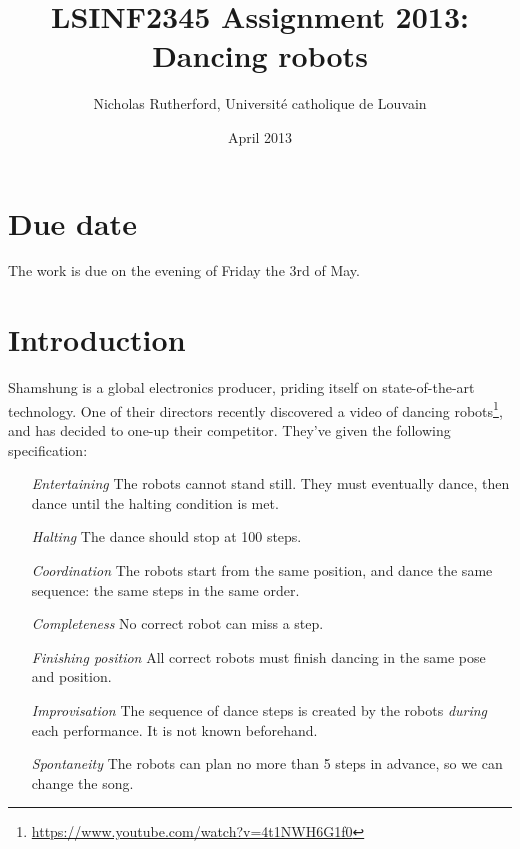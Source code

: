 \documentclass[a4paper]{article}
\title{LSINF2345 Assignment 2013: Dancing robots}
\author{Nicholas Rutherford, Université catholique de Louvain}
\date{April 2013}
\begin{document}
\ifpdf
{}
\else
{}
\fi

\maketitle

\section*{Due date} %
\label{sec:due_date}
The work is due on the evening of Friday the 3rd of May.


\section*{Introduction}

Shamshung is a global electronics producer, priding itself on state-of-the-art
technology. One of their directors recently discovered a video of dancing
robots\footnote{\url{https://www.youtube.com/watch?v=4t1NWH6G1f0}}, and has
decided to one-up their competitor. They've given the following specification:

\begin{itemize}

  \item[\emph{Entertaining}] The robots cannot stand still. They must eventually dance, then dance until the halting condition is met.

  \item[\emph{Halting}] The dance should stop at 100 steps.

  \item[\emph{Coordination}] The robots start from the same position, and dance the same sequence: the same steps in the same order.

  \item[\emph{Completeness}] No correct robot can miss a step.

  \item[\emph{Finishing position}] All correct robots must finish dancing in the same
  pose and position.

  \item[\emph{Improvisation}] The sequence of dance steps is created by the robots
  \emph{during} each performance. It is not known beforehand.

  \item[\emph{Spontaneity}] The robots can plan no more than 5 steps in advance, so we can change the song.

\end{itemize}
\end{document}
